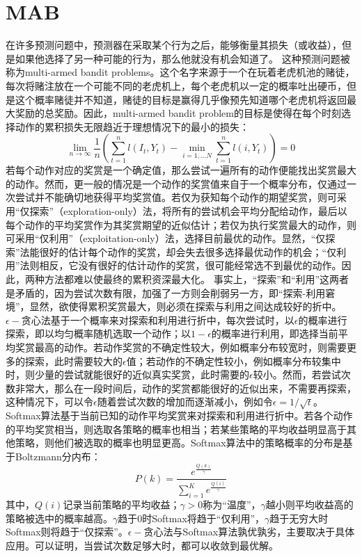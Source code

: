 \section{MAB}
在许多预测问题中，预测器在采取某个行为之后，能够衡量其损失（或收益），但是如果他选择了另一种可能的行为，那么他就没有机会知道了。 这种预测问题被称为multi-armed bandit problems。这个名字来源于一个在玩着老虎机池的赌徒，每次将赌注放在一个可能不同的老虎机上，每个老虎机以一定的概率吐出硬币，但是这个概率赌徒并不知道，赌徒的目标是赢得几乎像预先知道哪个老虎机将返回最大奖励的总奖励。因此，multi-armed bandit problem的目标是使得在每个时刻选择动作的累积损失无限趋近于理想情况下的最小的损失：
$$
\lim\limits_{n\to\infty}\frac{1}{n}(\sum_{t=1}^{n}l(I_t, Y_t)-\min_{i=1,...N}\sum_{t=1}^{n}l(i, Y_t)) = 0
$$
若每个动作对应的奖赏是一个确定值，那么尝试一遍所有的动作便能找出奖赏最大的动作。然而，更一般的情况是一个动作的奖赏值来自于一个概率分布，仅通过一次尝试并不能确切地获得平均奖赏值。若仅为获知每个动作的期望奖赏，则可采用“仅探索”（exploration-only）法，将所有的尝试机会平均分配给动作，最后以每个动作的平均奖赏作为其奖赏期望的近似估计；若仅为执行奖赏最大的动作，则可采用“仅利用”（exploitation-only）法，选择目前最优的动作。显然，“仅探索”法能很好的估计每个动作的奖赏，却会失去很多选择最优动作的机会；“仅利用”法则相反，它没有很好的估计动作的奖赏，很可能经常选不到最优的动作。因此，两种方法都难以使最终的累积资深最大化。
事实上，“探索”和“利用”这两者是矛盾的，因为尝试次数有限，加强了一方则会削弱另一方，即“探索-利用窘境”，显然，欲使得累积奖赏最大，则必须在探索与利用之间达成较好的折中。
$\epsilon-$贪心法基于一个概率来对探索和利用进行折中，每次尝试时，以$\epsilon$的概率进行探索，即以均匀概率随机选取一个动作；以$1-\epsilon$的概率进行利用，即选择当前平均奖赏最高的动作。若动作奖赏的不确定性较大，例如概率分布较宽时，则需要更多的探索，此时需要较大的$\epsilon$值；若动作的不确定性较小，例如概率分布较集中时，则少量的尝试就能很好的近似真实奖赏，此时需要的$\epsilon$较小。然而，若尝试次数非常大，那么在一段时间后，动作的奖赏都能很好的近似出来，不需要再探索，这种情况下，可以令$\epsilon$随着尝试次数的增加而逐渐减小，例如令$\epsilon = 1/\sqrt{t}$。Softmax算法基于当前已知的动作平均奖赏来对探索和利用进行折中。若各个动作的平均奖赏相当，则选取各策略的概率也相当；若某些策略的平均收益明显高于其他策略，则他们被选取的概率也明显更高。Softmax算法中的策略概率的分布是基于Boltzmann分内布：
$$
P(k) = \frac{e^{\frac{Q(k)}{\gamma}}}{\sum_{i=1}^{K}e^{\frac{Q(i)}{\gamma}}}
$$
其中，$Q(i)$记录当前策略的平均收益；$\gamma>0$称为“温度”，$\gamma$越小则平均收益高的策略被选中的概率越高。$\gamma$趋于0时Softmax将趋于“仅利用”，$\gamma$趋于无穷大时Softmax则将趋于“仅探索”。$\epsilon-$贪心法与Softmax算法孰优孰劣，主要取决于具体应用。可以证明，当尝试次数足够大时，都可以收敛到最优解。

